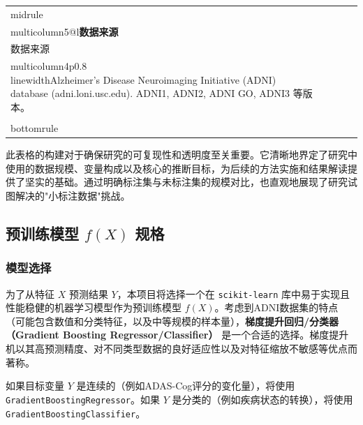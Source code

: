 \documentclass[12pt,a4paper]{article}
\begin{document}
\begin{table}[H]
\begin{tabular}{@{}lllll@{}}
        \\midrule
        \\multicolumn{5}{@{}l}{\textbf{数据来源}} \\
        数据来源 & \\multicolumn{4}{p{0.8\\linewidth}}{Alzheimer's Disease Neuroimaging Initiative (ADNI) database (adni.loni.usc.edu). ADNI1, ADNI2, ADNI GO, ADNI3 等版本。} \\
        \\bottomrule
    \end{tabular}
\end{table}
此表格的构建对于确保研究的可复现性和透明度至关重要。它清晰地界定了研究中使用的数据规模、变量构成以及核心的推断目标，为后续的方法实施和结果解读提供了坚实的基础。通过明确标注集与未标注集的规模对比，也直观地展现了研究试图解决的"小标注数据"挑战。

\subsection{预训练模型 $f(X)$ 规格}
\label{sec:model_fx_spec}

\subsubsection{模型选择}
\label{sec:model_selection_fx}
为了从特征 $X$ 预测结果 $Y$，本项目将选择一个在 \texttt{scikit-learn} 库中易于实现且性能稳健的机器学习模型作为预训练模型 $f(X)$。考虑到ADNI数据集的特点（可能包含数值和分类特征，以及中等规模的样本量），\textbf{梯度提升回归/分类器（Gradient Boosting Regressor/Classifier）} 是一个合适的选择。梯度提升机以其高预测精度、对不同类型数据的良好适应性以及对特征缩放不敏感等优点而著称。

如果目标变量 $Y$ 是连续的（例如ADAS-Cog评分的变化量），将使用 \texttt{GradientBoostingRegressor}。如果 $Y$ 是分类的（例如疾病状态的转换），将使用 \texttt{GradientBoostingClassifier}。
\end{document}
